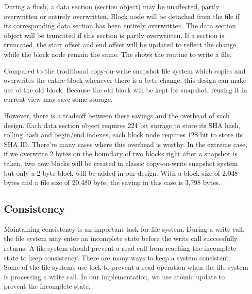     During a flush, a data section (section object) may be unaffected, partly overwritten or entirely overwritten. Block node will be detached from the file if its corresponding data section has been entirely overwritten. The data section object will be truncated if this section is partly overwritten. If a section is truncated, the start offset and end offset will be updated to reflect the change while the block node remain the same. The  shows the routine to write a file.

    Compared to the traditional copy-on-write snapshot file system which copies and overwrites the entire block whenever there is a byte change, this design can make use of the old block. Because the old block will be kept for snapshot, reusing it in current view may save some storage.

    However, there is a tradeoff between these savings and the overhead of such design. Each data section object requires 224 bit storage to store its SHA hash, rolling hash and begin/end indexes, each block node requires 128 bit to store its SHA ID. There're many cases where this overhead is worthy. In the extreme case, if we overwrite 2 bytes on the boundary of two blocks right after a snapshot is taken, two new blocks will be created in classic copy-on-write snapshot system but only a 2-byte block will be added in our design. With a block size of 2,048 bytes and a file size of 20,480 byte, the saving in this case is 3,798 bytes.

\subsection{Consistency}

    Maintaining consistency is an important task for file system. During a write call, the file system may enter an incomplete state before the write call successfully returns. A file system should prevent a read call from reaching the incomplete state to keep consistency. There are many ways to keep a system consistent. Some of the file systems use lock to prevent a read operation when the file system is processing a write call. In our implementation, we use atomic update to prevent the incomplete state.

